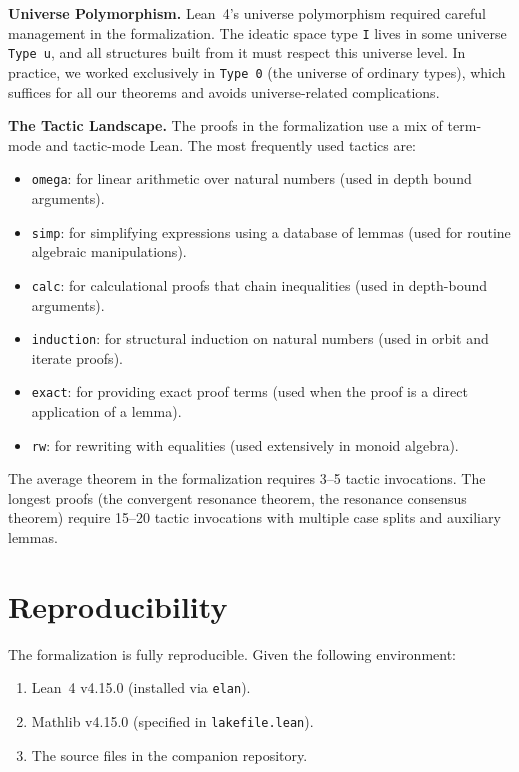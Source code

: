 \documentclass[11pt,openany]{book}
\theoremstyle{definition}
\theoremstyle{plain}
\theoremstyle{remark}
\begin{document}
\textbf{Universe Polymorphism.} Lean~4's universe polymorphism required careful management in the formalization. The ideatic space type \texttt{I} lives in some universe \texttt{Type u}, and all structures built from it must respect this universe level. In practice, we worked exclusively in \texttt{Type 0} (the universe of ordinary types), which suffices for all our theorems and avoids universe-related complications.

\textbf{The Tactic Landscape.} The proofs in the formalization use a mix of term-mode and tactic-mode Lean. The most frequently used tactics are:
\begin{itemize}
\item \texttt{omega}: for linear arithmetic over natural numbers (used in depth bound arguments).
\item \texttt{simp}: for simplifying expressions using a database of lemmas (used for routine algebraic manipulations).
\item \texttt{calc}: for calculational proofs that chain inequalities (used in depth-bound arguments).
\item \texttt{induction}: for structural induction on natural numbers (used in orbit and iterate proofs).
\item \texttt{exact}: for providing exact proof terms (used when the proof is a direct application of a lemma).
\item \texttt{rw}: for rewriting with equalities (used extensively in monoid algebra).
\end{itemize}

The average theorem in the formalization requires 3--5 tactic invocations. The longest proofs (the convergent resonance theorem, the resonance consensus theorem) require 15--20 tactic invocations with multiple case splits and auxiliary lemmas.

\section{Reproducibility}

The formalization is fully reproducible. Given the following environment:

\begin{enumerate}
\item Lean~4 v4.15.0 (installed via \texttt{elan}).
\item Mathlib v4.15.0 (specified in \texttt{lakefile.lean}).
\item The source files in the companion repository.
\end{enumerate}
\end{document}
